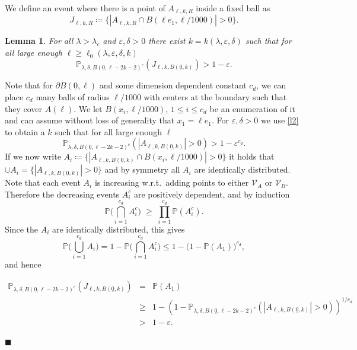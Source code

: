 \documentclass[11pt]{article}%
\newenvironment{proof}{\vspace{1ex}\noindent{\bf Proof.}}{\hspace*{\fill}$\blacksquare$\vspace{1ex}}
\newtheorem{lemma}[lemma]{Lemma}
\newcommand{\eps}{\varepsilon}
\newcommand{\Pro}{\mathbb{P}}
\newcommand{\typ}{\underline{0}}
\begin{document}
\noindent
We define an event where there is a point of $ A_{\ell,k,R} $ inside a fixed ball as
\begin{equation*}
	J_{\ell,k,R}\coloneqq\{|A_{\ell,k,R}\cap B(\ell e_1,\ell/1000)|>0\}.
\end{equation*}
\begin{lemma}\label{l3}
	For all $ \lambda>\lambda_c $ and $ \eps,\delta>0 $ there exist $ k=k(\lambda,\eps,\delta) $ such that for all large enough $ \ell\geq \ell_0(\lambda,\eps,\delta,k) $
	\begin{equation*}
		\Pro_{\lambda,\delta,B(\typ,\ell-2k-2)^c}(J_{\ell,k,B(\typ,k)})>1-\eps.
	\end{equation*}
\end{lemma}
\begin{proof}
	Note that for $ \partial B(\typ,\ell) $ and some dimension dependent constant $ c_d $, we can place $ c_d $ many balls of radius $ \ell/1000 $ with centers at the boundary such that they cover $ A(\ell) $. We let $ B(x_i,\ell/1000) $, $ 1\leq i\leq c_d $ be an enumeration of it and can assume without loss of generality that $ x_1=\ell e_1 $. For $ \eps,\delta>0 $ we use \cref{l2} to obtain a $ k $ such that for all large enough $ \ell $
	\begin{equation*}
		\Pro_{\lambda,\delta,B(\typ,\ell-2k-2)^c}(|A_{\ell,k,B(\typ,k)}|> 0)>1-\eps^{c_d}.
	\end{equation*}
	If we now write $ A_i\coloneqq \{|A_{\ell,k,B(\typ,k)}\cap B(x_i,\ell/1000)|>0\} $ it holds that $ \cup A_i= \{|A_{\ell,k,B(\typ,k)}|> 0\} $ and by symmetry all $ A_i $ are identically distributed. Note that each event $A_i$ is {increasing} w.r.t.\ adding points to either
$\mathcal V_A$ or $\mathcal V_B$. Therefore the decreasing events $A_i^c$ are positively dependent, and by
induction
\begin{equation*}
    \Pro\Big(\bigcap_{i=1}^{c_d} A_i^c\Big)\;\ge\;\prod_{i=1}^{c_d}\Pro(A_i^c).
\end{equation*}
Since the $A_i$ are identically distributed, this gives
\begin{equation*}
    \Pro\Big(\bigcup_{i=1}^{c_d} A_i\Big)
=1-\Pro\Big(\bigcap_{i=1}^{c_d} A_i^c\Big)
\le 1-\big(1-\Pro(A_1)\big)^{c_d},
\end{equation*}
and hence

\begin{equation*}
\begin{array}{rcl}
\Pro_{\lambda,\delta,B(\typ,\ell-2k-2)^c}(J_{\ell,k,B(\typ,k)}) 
& = & \Pro(A_1) \\
& \geq & 1-(1-\Pro_{\lambda,\delta,B(\typ,\ell-2k-2)^c}(|A_{\ell,k,B(\typ,k)}|> 0))^{1/c_d} \\
& >& 1-\eps.
\end{array}
	\end{equation*}
	
\end{proof}
\end{document}
